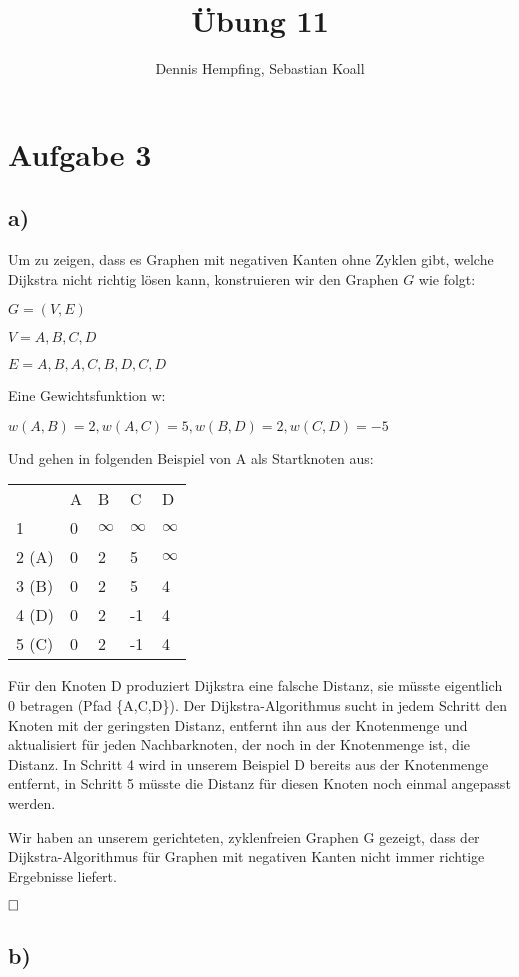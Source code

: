 \documentclass[12pt]{scrartcl}%
\theoremstyle{nonumberplain}
\begin{document}
\author{Dennis Hempfing, Sebastian Koall}
\title{Übung 11}
\date{} 
\pagestyle{myheadings}

\maketitle %

\section*{Aufgabe 3}

\subsection*{a)}
Um zu zeigen, dass es Graphen mit negativen Kanten ohne Zyklen gibt, welche Dijkstra nicht richtig lösen kann, konstruieren wir den Graphen $G$ wie folgt:
\vspace{0.1cm}

$G=(V,E)$

$V={A,B,C,D}$

$E={{A,B},{A,C},{B,D},{C,D}}$

\vspace{0.3cm}
Eine Gewichtsfunktion w:
\vspace{0.1cm}

$w({A,B})=2, w({A,C})=5, w({B,D})=2, w({C,D})=-5 $

\vspace{0.4cm}
Und gehen in folgenden Beispiel von A als Startknoten aus:
\vspace{0.1cm}

\begin{tabular}{p{1cm}p{2cm}p{2cm}p{2cm}l}
	  & A & B & C & D\\
	1 & 0 & $\infty$ & $\infty$ & $\infty$\\
	2 (A) & 0 & 2 & 5 & $\infty$\\
	3 (B) & 0 & 2 & 5 & 4\\
	4 (D) & 0 & 2 & -1 & 4\\
	5 (C) & 0 & 2 & -1 & 4\\
\end{tabular}
\vspace{0.4cm}

Für den Knoten D produziert Dijkstra eine falsche Distanz, sie müsste eigentlich 0 betragen (Pfad \{A,C,D\}). Der Dijkstra-Algorithmus sucht in jedem Schritt den Knoten mit der geringsten Distanz, entfernt ihn aus der Knotenmenge und aktualisiert für jeden Nachbarknoten, der noch in der Knotenmenge ist, die Distanz. In Schritt 4 wird in unserem Beispiel D bereits aus der Knotenmenge entfernt, in Schritt 5 müsste die Distanz für diesen Knoten noch einmal angepasst werden.

Wir haben an unserem gerichteten, zyklenfreien Graphen G gezeigt, dass der Dijkstra-Algorithmus für Graphen mit negativen Kanten nicht immer richtige Ergebnisse liefert.

$\hfill \square $

\subsection*{b)}
\end{document}
